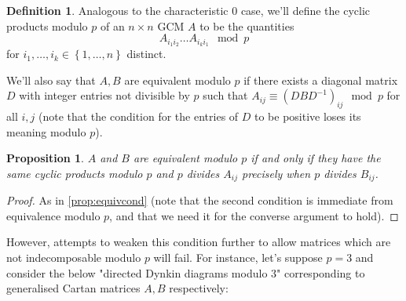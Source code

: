 \documentclass[11pt,a4paper]{report}
\newtheorem{proposition}[theorem]{Proposition}
\theoremstyle{definition}
\newtheorem{definition}[theorem]{Definition}
\begin{document}
\begin{definition}Analogous to the characteristic $0$ case, we'll define the cyclic products modulo $p$ of an $n \times n$ GCM $A$ to be the quantities
\begin{equation*}A_{i_1i_2} \ldots A_{i_ki_1} \mod p\end{equation*} for $i_1, \ldots, i_k \in \left\{1, \ldots, n\right\}$ distinct.

We'll also say that $A, B$ are equivalent modulo $p$ if there exists a diagonal matrix $D$ with integer entries not divisible by $p$ such that $A_{ij} \equiv (DBD^{-1})_{ij} \mod p$ for all $i, j$ (note that the condition for the entries of $D$ to be positive loses its meaning modulo $p$).
\end{definition}

\begin{proposition}$A$ and $B$ are equivalent modulo $p$ if and only if they have the same cyclic products modulo $p$ and $p$ divides $A_{ij}$ precisely when $p$ divides $B_{ij}$.\end{proposition}

\begin{proof}
    As in \ref{prop:equivcond} (note that the second condition is immediate from equivalence modulo $p$, and that we need it for the converse argument to hold).
\end{proof}

However, attempts to weaken this condition further to allow matrices which are not indecomposable modulo $p$ will fail. For instance, let's suppose $p = 3$ and consider the below "directed Dynkin diagrams modulo $3$" corresponding to generalised Cartan matrices $A, B$ respectively: 

 \begin{figure}[h]
\centering
{}
\end{figure}

 \begin{figure}[h]
\centering
{}
\end{figure}
\end{document}
